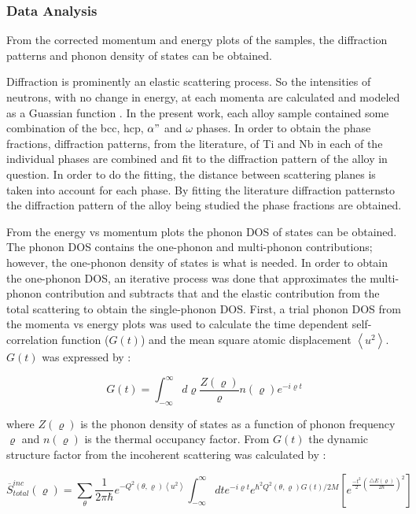 \subsubsection{Data Analysis}

From the corrected momentum and energy plots of the samples, the diffraction patterns and phonon density of states can be obtained.

Diffraction is prominently an elastic scattering process. So the intensities of neutrons, with no change in energy, at each momenta are calculated and modeled as a Guassian function \cite{Young1998,Toraya1986}. In the present work, each alloy sample contained some combination of the bcc, hcp, $\alpha"$ and $\omega$ phases. In order to obtain the phase fractions, diffraction patterns, from the literature, of Ti and Nb in each of the individual phases are combined and fit to the diffraction pattern of the alloy in question. In order to do the fitting, the distance between scattering planes is taken into account for each phase. By fitting the literature diffraction patternsto the diffraction pattern of the alloy being studied the phase fractions are obtained. 

From the energy vs momentum plots the phonon DOS of states can be obtained. The phonon DOS contains the one-phonon and multi-phonon contributions; however, the one-phonon density of states is what is needed. In order to obtain the one-phonon DOS, an iterative process was done that approximates the multi-phonon contribution and subtracts that and the elastic contribution from the total scattering to obtain the single-phonon DOS. First, a trial phonon DOS from the momenta vs energy plots was used to calculate the time dependent self-correlation function ($G(t)$) and the mean square atomic displacement $\left< u^{2} \right>$. $G(t)$ was expressed by \cite{Manley2001}:

\begin{equation}
\label{eq: td_selfcorrelation}
G (t) = \int_{- \infty}^{\infty} d \varrho \frac{Z(\varrho)}{\varrho} n(\varrho) e^{- i \varrho t}
\end{equation}


\noindent where $Z(\varrho)$ is the phonon density of states as a function of phonon frequency $\varrho$ and $n(\varrho)$ is the thermal occupancy factor. From $G(t)$  the dynamic structure factor from the incoherent scattering was calculated by \cite{Manley2001}:

\begin{equation}
\label{eq: S_total_inc}
\overline{S}_{total}^{inc} (\varrho) = \sum_{\theta} \frac{1}{2 \pi \hbar} e^{- Q^{2} (\theta, \varrho) \left<u^{2} \right>} \int_{-\infty}^{\infty} dte^{-i \varrho t} e^{\hbar^{2}Q^{2}(\theta, \varrho) G(t)/2M} \left[ e^{\frac{-t^{2}}{2} \left(\frac{\bigtriangleup E (\varrho)}{2\hbar} \right)^{2}} \right]
\end{equation}

